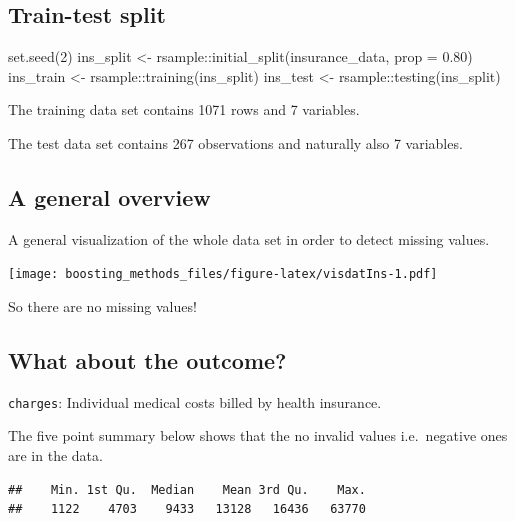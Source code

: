 \documentclass[
]{book}
\newenvironment{Shaded}{\begin{snugshade}}{\end{snugshade}}
\newcommand{\AttributeTok}[1]{\textcolor[rgb]{0.77,0.63,0.00}{#1}}
\newcommand{\DecValTok}[1]{\textcolor[rgb]{0.00,0.00,0.81}{#1}}
\newcommand{\FloatTok}[1]{\textcolor[rgb]{0.00,0.00,0.81}{#1}}
\newcommand{\FunctionTok}[1]{\textcolor[rgb]{0.00,0.00,0.00}{#1}}
\newcommand{\NormalTok}[1]{#1}
\newcommand{\OtherTok}[1]{\textcolor[rgb]{0.56,0.35,0.01}{#1}}
\newcommand{\SpecialCharTok}[1]{\textcolor[rgb]{0.00,0.00,0.00}{#1}}
\begin{document}
\hypertarget{train-test-split-1}{%
\subsection{Train-test split}\label{train-test-split-1}}

\begin{Shaded}
\begin{Highlighting}[]
\FunctionTok{set.seed}\NormalTok{(}\DecValTok{2}\NormalTok{)}
\NormalTok{ins\_split }\OtherTok{\textless{}{-}}\NormalTok{ rsample}\SpecialCharTok{::}\FunctionTok{initial\_split}\NormalTok{(insurance\_data, }\AttributeTok{prop =} \FloatTok{0.80}\NormalTok{)}
\NormalTok{ins\_train }\OtherTok{\textless{}{-}}\NormalTok{ rsample}\SpecialCharTok{::}\FunctionTok{training}\NormalTok{(ins\_split)}
\NormalTok{ins\_test  }\OtherTok{\textless{}{-}}\NormalTok{ rsample}\SpecialCharTok{::}\FunctionTok{testing}\NormalTok{(ins\_split)}
\end{Highlighting}
\end{Shaded}

The training data set contains 1071 rows and 7 variables.

The test data set contains 267 observations and naturally also 7 variables.

\hypertarget{a-general-overview}{%
\subsection{A general overview}\label{a-general-overview}}

A general visualization of the whole data set in order to detect missing values.

\texttt{[image: boosting\_methods\_files/figure-latex/visdatIns-1.pdf]}

So there are no missing values!

\hypertarget{what-about-the-outcome}{%
\subsection{What about the outcome?}\label{what-about-the-outcome}}

\texttt{charges}: Individual medical costs billed by health insurance.

The five point summary below shows that the no invalid values i.e.~negative ones are in the data.

\begin{verbatim}
##    Min. 1st Qu.  Median    Mean 3rd Qu.    Max. 
##    1122    4703    9433   13128   16436   63770
\end{verbatim}
\end{document}
